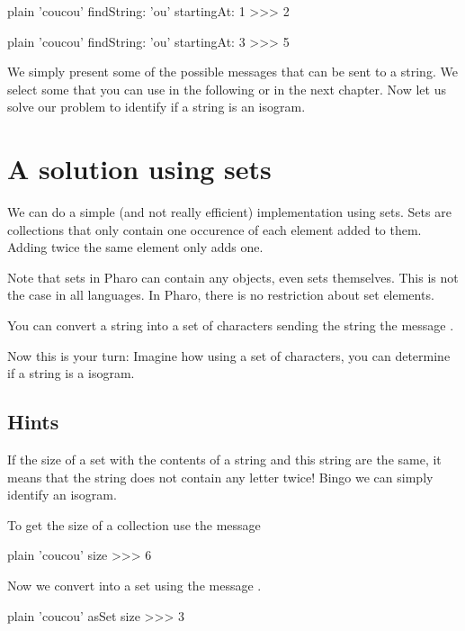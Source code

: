 \documentclass[10pt,twoside,english]{_support/latex/sbabook/sbabook}
\begin{document}
\begin{displaycode}{plain}
'coucou' findString: 'ou' startingAt: 1
>>> 2
\end{displaycode}

\begin{displaycode}{plain}
'coucou' findString: 'ou' startingAt: 3
>>> 5
\end{displaycode}

We simply present some of the possible messages that can be sent to a string. We select some that you can use in the following or in the next chapter. Now let us solve our problem to identify if a string is an isogram. 
\section{A solution using sets}
We can do a simple (and not really efficient) implementation using sets. Sets are collections that only contain one occurence of each element added to them. Adding twice the same element only adds one. 

Note that sets in Pharo can contain any objects, even sets themselves. This is not the case in all languages. In Pharo, there is no restriction about set elements.  

You can convert a string into a set of characters sending the string the message . 


Now this is your turn: Imagine how using a set of characters, you can determine if a string is a isogram.
\subsection{Hints}
If the size of a set with the contents of a string and this string are the same, it means that the string does not contain any letter twice! Bingo we can simply identify an isogram. 

To get the size of a collection use the message  

\begin{displaycode}{plain}
'coucou' size 
>>> 6
\end{displaycode}

Now we convert  into a set using the message .

\begin{displaycode}{plain}
'coucou' asSet size
>>> 3
\end{displaycode}
\end{document}
